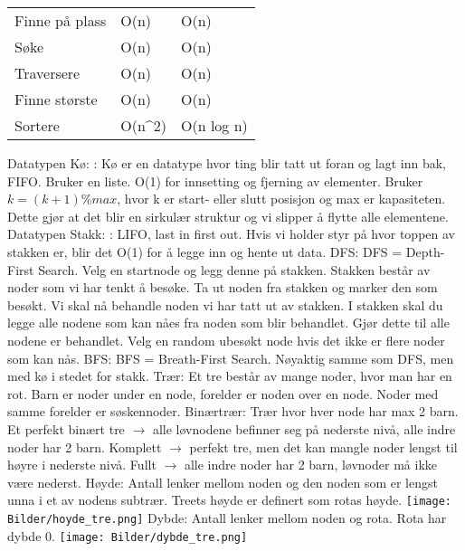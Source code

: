 \documentclass[10pt,a4paper]{article}
\begin{document}
\begin{multicols}{4}
{\begin{table}[H]
{\begin{tabular}{lll}
Finne på plass       & O(n)       & O(n)     \\
Søke                 & O(n)       & O(n) \\
Traversere           & O(n)       & O(n)     \\
Finne største        & O(n)       & O(n)     \\
Sortere              & O(n^2) & O(n log n)      
\end{tabular}
}
\end{table}
\noindent
\color{red}Datatypen Kø: \color{black}: 
Kø er en datatype hvor ting blir tatt ut foran og lagt inn bak, FIFO. Bruker en liste. O(1) for innsetting og fjerning av elementer. Bruker $k = (k+1)\%max$, hvor k er start- eller slutt posisjon og max er kapasiteten. Dette gjør at det blir en sirkulær struktur og vi slipper å flytte alle elementene.
\noindent
\color{red}Datatypen Stakk: \color{black}: 
LIFO, last in first out. Hvis vi holder styr på hvor toppen av stakken er, blir det O(1) for å legge inn og hente ut data.
\newline
\noindent
\color{red}DFS: \color{black}
DFS = Depth-First Search. Velg en startnode og legg denne på stakken. Stakken består av noder som vi har tenkt å besøke. Ta ut noden fra stakken og marker den som besøkt. Vi skal nå behandle noden vi har tatt ut av stakken. I stakken skal du legge alle nodene som kan nåes fra noden som blir behandlet. Gjør dette til alle nodene er behandlet. Velg en random ubesøkt node hvis det ikke er flere noder som kan nås. 
\noindent
\color{red}BFS: \color{black}
BFS = Breath-First Search. Nøyaktig samme som DFS, men med kø i stedet for stakk.
\noindent
\color{red}Trær\color{black}: 
Et tre består av mange noder, hvor man har en rot. Barn er noder under en node, forelder er noden over en node. Noder med samme forelder er søskennoder. 
\noindent
\color{red}Binærtrær\color{black}: 
Trær hvor hver node har max 2 barn. Et perfekt binært tre $\rightarrow$ alle løvnodene befinner seg på nederste nivå, alle indre noder har 2 barn. Komplett $\rightarrow$ perfekt tre, men det kan mangle noder lengst til høyre i nederste nivå. Fullt $\rightarrow$ alle indre noder har 2 barn, løvnoder må ikke være nederst.  \color{orange}Høyde\color{black}: Antall lenker mellom noden og den noden som er lengst unna i et av nodens subtrær. Treets høyde er
definert som rotas høyde.
\texttt{[image: Bilder/hoyde\_tre.png]}\newline
\noindent\color{orange}Dybde\color{black}: Antall lenker mellom noden og rota. Rota har dybde 0. \texttt{[image: Bilder/dybde\_tre.png]}\newline

}
\end{multicols}
\end{document}
